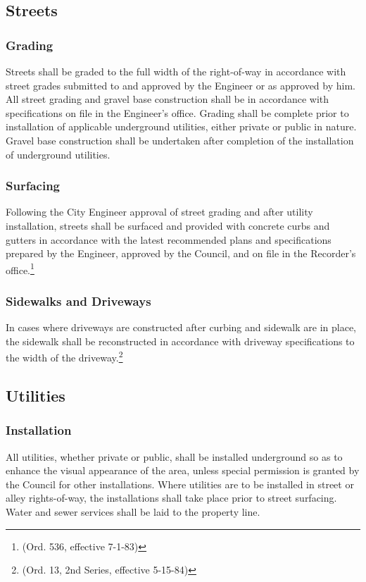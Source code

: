 \subsection{Streets}
\subsubsection{Grading}
Streets shall be graded to the full width of the right-of-way in accordance with street grades submitted to and approved by the Engineer or as approved by him. All street grading and gravel base construction shall be in accordance with specifications on file in the Engineer’s office. Grading shall be complete prior to installation of applicable underground utilities, either private or public in nature. Gravel base construction shall be undertaken after completion of the installation of underground utilities.
\subsubsection{Surfacing}
Following the City Engineer approval of street grading and after utility installation, streets shall be surfaced and provided with concrete curbs and gutters in accordance with the latest recommended plans and specifications prepared by the Engineer, approved by the Council, and on file in the Recorder’s office.\footnote{(Ord. 536, effective 7-1-83)}
\subsubsection{Sidewalks and Driveways}
In cases where driveways are constructed after curbing and sidewalk are in place, the sidewalk shall be reconstructed in accordance with driveway specifications to the width of the driveway.\footnote{(Ord. 13, 2nd Series, effective 5-15-84)}
\subsection{Utilities}
\subsubsection{Installation}
All utilities, whether private or public, shall be installed underground so as to enhance the visual appearance of the area, unless special permission is granted by the Council for other installations. Where utilities are to be installed in street or alley rights-of-way, the installations shall take place prior to street surfacing. Water and sewer services shall be laid to the property line.
